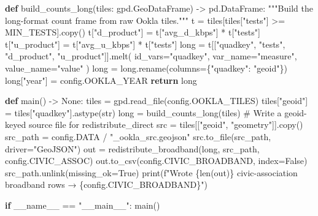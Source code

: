 \documentclass[
  letterpaper,
  DIV=11,
  numbers=noendperiod]{scrreprt}
\newenvironment{Shaded}{\begin{snugshade}}{\end{snugshade}}
\newcommand{\BuiltInTok}[1]{\textcolor[rgb]{0.00,0.23,0.31}{#1}}
\newcommand{\CommentTok}[1]{\textcolor[rgb]{0.37,0.37,0.37}{#1}}
\newcommand{\ControlFlowTok}[1]{\textcolor[rgb]{0.00,0.23,0.31}{\textbf{#1}}}
\newcommand{\KeywordTok}[1]{\textcolor[rgb]{0.00,0.23,0.31}{\textbf{#1}}}
\newcommand{\NormalTok}[1]{\textcolor[rgb]{0.00,0.23,0.31}{#1}}
\newcommand{\OperatorTok}[1]{\textcolor[rgb]{0.37,0.37,0.37}{#1}}
\newcommand{\SpecialCharTok}[1]{\textcolor[rgb]{0.37,0.37,0.37}{#1}}
\newcommand{\SpecialStringTok}[1]{\textcolor[rgb]{0.13,0.47,0.30}{#1}}
\newcommand{\StringTok}[1]{\textcolor[rgb]{0.13,0.47,0.30}{#1}}
\newcommand{\VariableTok}[1]{\textcolor[rgb]{0.07,0.07,0.07}{#1}}
\begin{document}
\begin{Shaded}
\begin{Highlighting}[]
\KeywordTok{def}\NormalTok{ build\_counts\_long(tiles: gpd.GeoDataFrame) }\OperatorTok{{-}\textgreater{}}\NormalTok{ pd.DataFrame:}
    \CommentTok{"""Build the long{-}format count frame from raw Ookla tiles."""}
\NormalTok{    t }\OperatorTok{=}\NormalTok{ tiles[tiles[}\StringTok{"tests"}\NormalTok{] }\OperatorTok{\textgreater{}=}\NormalTok{ MIN\_TESTS].copy()}
\NormalTok{    t[}\StringTok{"d\_product"}\NormalTok{] }\OperatorTok{=}\NormalTok{ t[}\StringTok{"avg\_d\_kbps"}\NormalTok{] }\OperatorTok{*}\NormalTok{ t[}\StringTok{"tests"}\NormalTok{]}
\NormalTok{    t[}\StringTok{"u\_product"}\NormalTok{] }\OperatorTok{=}\NormalTok{ t[}\StringTok{"avg\_u\_kbps"}\NormalTok{] }\OperatorTok{*}\NormalTok{ t[}\StringTok{"tests"}\NormalTok{]}
    \BuiltInTok{long} \OperatorTok{=}\NormalTok{ t[[}\StringTok{"quadkey"}\NormalTok{, }\StringTok{"tests"}\NormalTok{, }\StringTok{"d\_product"}\NormalTok{, }\StringTok{"u\_product"}\NormalTok{]].melt(}
\NormalTok{        id\_vars}\OperatorTok{=}\StringTok{"quadkey"}\NormalTok{, var\_name}\OperatorTok{=}\StringTok{"measure"}\NormalTok{, value\_name}\OperatorTok{=}\StringTok{"value"}
\NormalTok{    )}
    \BuiltInTok{long} \OperatorTok{=} \BuiltInTok{long}\NormalTok{.rename(columns}\OperatorTok{=}\NormalTok{\{}\StringTok{"quadkey"}\NormalTok{: }\StringTok{"geoid"}\NormalTok{\})}
    \BuiltInTok{long}\NormalTok{[}\StringTok{"year"}\NormalTok{] }\OperatorTok{=}\NormalTok{ config.OOKLA\_YEAR}
    \ControlFlowTok{return} \BuiltInTok{long}


\KeywordTok{def}\NormalTok{ main() }\OperatorTok{{-}\textgreater{}} \VariableTok{None}\NormalTok{:}
\NormalTok{    tiles }\OperatorTok{=}\NormalTok{ gpd.read\_file(config.OOKLA\_TILES)}
\NormalTok{    tiles[}\StringTok{"geoid"}\NormalTok{] }\OperatorTok{=}\NormalTok{ tiles[}\StringTok{"quadkey"}\NormalTok{].astype(}\BuiltInTok{str}\NormalTok{)}
    \BuiltInTok{long} \OperatorTok{=}\NormalTok{ build\_counts\_long(tiles)}
    \CommentTok{\# Write a geoid{-}keyed source file for redistribute\_direct}
\NormalTok{    src }\OperatorTok{=}\NormalTok{ tiles[[}\StringTok{"geoid"}\NormalTok{, }\StringTok{"geometry"}\NormalTok{]].copy()}
\NormalTok{    src\_path }\OperatorTok{=}\NormalTok{ config.DATA }\OperatorTok{/} \StringTok{"\_ookla\_src.geojson"}
\NormalTok{    src.to\_file(src\_path, driver}\OperatorTok{=}\StringTok{"GeoJSON"}\NormalTok{)}
\NormalTok{    out }\OperatorTok{=}\NormalTok{ redistribute\_broadband(}\BuiltInTok{long}\NormalTok{, src\_path, config.CIVIC\_ASSOC)}
\NormalTok{    out.to\_csv(config.CIVIC\_BROADBAND, index}\OperatorTok{=}\VariableTok{False}\NormalTok{)}
\NormalTok{    src\_path.unlink(missing\_ok}\OperatorTok{=}\VariableTok{True}\NormalTok{)}
    \BuiltInTok{print}\NormalTok{(}\SpecialStringTok{f"Wrote }\SpecialCharTok{\{}\BuiltInTok{len}\NormalTok{(out)}\SpecialCharTok{\}}\SpecialStringTok{ civic{-}association broadband rows → }\SpecialCharTok{\{}\NormalTok{config}\SpecialCharTok{.}\NormalTok{CIVIC\_BROADBAND}\SpecialCharTok{\}}\SpecialStringTok{"}\NormalTok{)}


\ControlFlowTok{if} \VariableTok{\_\_name\_\_} \OperatorTok{==} \StringTok{"\_\_main\_\_"}\NormalTok{:}
\NormalTok{    main()}
\end{Highlighting}
\end{Shaded}
\end{document}
